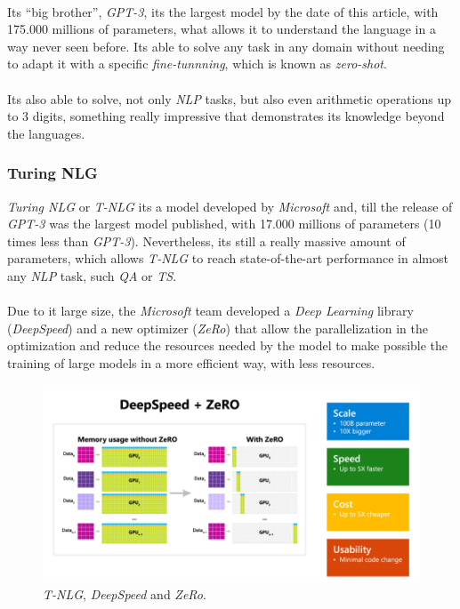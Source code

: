\paragraph{}
Its ``big brother'', \emph{GPT-3}, its the largest model by the date of this article, with 175.000 millions of parameters, what allows it to understand the language in a way never seen before. Its able to solve any task in any domain without needing to adapt it with a specific \emph{fine-tunnning}, which is known as \emph{zero-shot}.
\paragraph{}
Its also able to solve, not only \emph{NLP} tasks, but also even arithmetic operations up to 3 digits, something really impressive that demonstrates its knowledge beyond the languages.
\subsubsection{Turing NLG}
\noindent \emph{Turing NLG} or \emph{T-NLG}\cite{Rosset2020} its a model developed by \emph{Microsoft} and, till the release of \emph{GPT-3} was the largest model published, with 17.000 millions of parameters (10 times less than \emph{GPT-3}). Nevertheless, its still a really massive amount of parameters, which allows \emph{T-NLG} to reach state-of-the-art performance in almost any \emph{NLP} task, such \emph{QA} or \emph{TS}.
\paragraph{}
Due to it large size, the \emph{Microsoft} team developed a \emph{Deep Learning} library (\emph{DeepSpeed}) and a new optimizer (\emph{ZeRo}) that allow the parallelization in the optimization and reduce the resources needed by the model to make possible the training of large models in a more efficient way, with less resources.
\begin{figure}[h!]
	\centering
	\includegraphics[scale=0.35]{images/tnlg}
	\caption{\emph{T-NLG}, \emph{DeepSpeed} and \emph{ZeRo}.}
	\label{fig:tnlg}
\end{figure}
